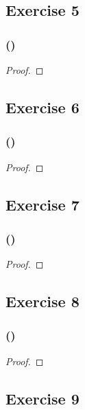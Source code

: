 \documentclass[14pt]{extarticle}
\begin{document}
\subsection{Exercise 5}

\subsubsection{()}

\begin{proof}

\end{proof}

\subsection{Exercise 6}

\subsubsection{()}

\begin{proof}

\end{proof}

\subsection{Exercise 7}

\subsubsection{()}

\begin{proof}

\end{proof}

\subsection{Exercise 8}

\subsubsection{()}

\begin{proof}

\end{proof}

\subsection{Exercise 9}
\end{document}
